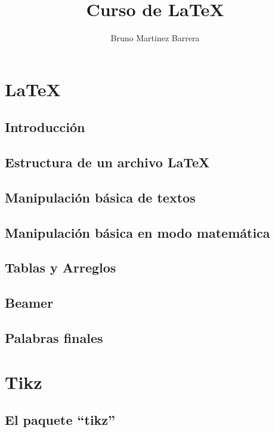 \documentclass[letterpaper,12pt]{book}
\title{Curso de \LaTeX{}}
\author{Bruno Martinez Barrera}
\begin{document}
    
\maketitle
\tableofcontents

\part{LaTeX}
\chapter{Introducción}
	
    

\chapter{Estructura de un archivo \LaTeX{}}
    
    
    
\chapter{Manipulación básica de textos}
    
    
    
\chapter{Manipulación básica en modo matemática}
    
    
    
\chapter{Tablas y Arreglos}

    
    
\chapter{Beamer}

    
    
\chapter{Palabras finales}

    
    
\part{Tikz}
\chapter{El paquete ``tikz''}

    
    
\end{document}
